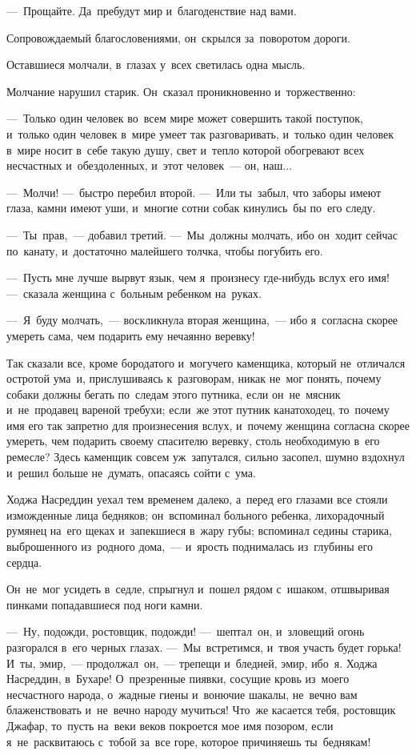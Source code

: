 \documentclass[12pt,a4paper]{book}
\begin{document}
—~Прощайте. Да~пребудут мир и~благоденствие над вами.

Сопровождаемый благословениями, он~скрылся за~поворотом дороги.

Оставшиеся молчали, в~глазах у~всех светилась одна мысль.

Молчание нарушил старик. Он~сказал проникновенно и~торжественно:

—~Только один человек во~всем мире может совершить такой поступок, и~только один человек в~мире умеет так разговаривать, и~только один человек в~мире носит в~себе такую душу, свет и~тепло которой обогревают всех несчастных и~обездоленных, и~этот человек~— он, наш...

—~Молчи! —~быстро перебил второй. —~Или ты~забыл, что заборы имеют глаза, камни имеют уши, и~многие сотни собак кинулись~бы по~его следу.

—~Ты~прав,~— добавил третий. —~Мы~должны молчать, ибо он~ходит сейчас по~канату, и~достаточно малейшего толчка, чтобы погубить его.

—~Пусть мне лучше вырвут язык, чем я~произнесу где-нибудь вслух его имя! —~сказала женщина с~больным ребенком на~руках.

—~Я~буду молчать,~— воскликнула вторая женщина,~— ибо я~согласна скорее умереть сама, чем подарить ему нечаянно веревку!

Так сказали все, кроме бородатого и~могучего каменщика, который не~отличался остротой ума~и, прислушиваясь к~разговорам, никак не~мог понять, почему собаки должны бегать по~следам этого путника, если он~не~мясник и~не~продавец вареной требухи; если~же этот путник канатоходец, то~почему имя его так запретно для произнесения вслух, и~почему женщина согласна скорее умереть, чем подарить своему спасителю веревку, столь необходимую в~его ремесле? Здесь каменщик совсем уж~запутался, сильно засопел, шумно вздохнул и~решил больше не~думать, опасаясь сойти с~ума.

Ходжа Насреддин уехал тем временем далеко, а~перед его глазами все стояли изможденные лица бедняков; он~вспоминал больного ребенка, лихорадочный румянец на~его щеках и~запекшиеся в~жару губы; вспоминал седины старика, выброшенного из~родного дома,~— и~ярость поднималась из~глубины его сердца.

Он~не~мог усидеть в~седле, спрыгнул и~пошел рядом с~ишаком, отшвыривая пинками попадавшиеся под ноги камни.

—~Ну, подожди, ростовщик, подожди! —~шептал~он, и~зловещий огонь разгорался в~его черных глазах. —~Мы~встретимся, и~твоя участь будет горька! И~ты, эмир,~— продолжал~он,~— трепещи и~бледней, эмир, ибо~я. Ходжа Насреддин, в~Бухаре! О~презренные пиявки, сосущие кровь из~моего несчастного народа, о~жадные гиены и~вонючие шакалы, не~вечно вам блаженствовать и~не~вечно народу мучиться! Что~же касается тебя, ростовщик Джафар, то~пусть на~веки веков покроется мое имя позором, если я~не~расквитаюсь с~тобой за~все горе, которое причиняешь ты~беднякам!
\end{document}
